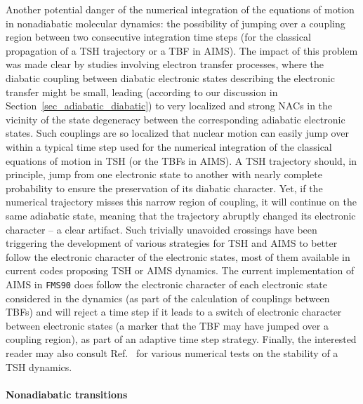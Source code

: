 \documentclass[9pt,bestpractices]{livecoms}
\begin{document}
Another potential danger of the numerical integration of the equations of motion in nonadiabatic molecular dynamics: the possibility of jumping over a coupling region between two consecutive integration time steps (for the classical propagation of a TSH trajectory or a TBF in AIMS). The impact of this problem was made clear by studies involving electron transfer processes,\cite{fernandezalberti2012tuc} where the diabatic coupling between diabatic electronic states describing the electronic transfer might be small, leading (according to our discussion in Section~\ref{sec_adiabatic_diabatic}) to very localized and strong NACs in the vicinity of the state degeneracy between the corresponding adiabatic electronic states. Such couplings are so localized that nuclear motion can easily jump over within a typical time step used for the numerical integration of the classical equations of motion in TSH (or the TBFs in AIMS). A TSH trajectory should, in principle, jump from one electronic state to another with nearly complete probability to ensure the preservation of its diabatic character. Yet, if the numerical trajectory misses this narrow region of coupling, it will continue on the same adiabatic state, meaning that the trajectory abruptly changed its electronic character -- a clear artifact.\cite{fernandezalberti2012tuc,NELSON2013208,MEEK2015117} Such trivially unavoided crossings have been triggering the development of various strategies for TSH and AIMS to better follow the electronic character of the electronic states,\cite{NELSON2013208,meek2014tdc,MEEK2015117,Lee2019,temen2021tuc,qiu2023practical} most of them available in current codes proposing TSH or AIMS dynamics. The current implementation of AIMS in \texttt{FMS90} does follow the electronic character of each electronic state considered in the dynamics (as part of the calculation of couplings between TBFs) and will reject a time step if it leads to a switch of electronic character between electronic states (a marker that the TBF may have jumped over a coupling region), as part of an adaptive time step strategy.\cite{levine2008implementation} Finally, the interested reader may also consult Ref.~ for various numerical tests on the stability of a TSH dynamics. 

\paragraph{Nonadiabatic transitions} 
\end{document}
